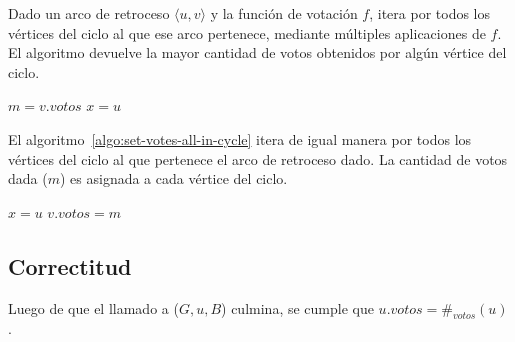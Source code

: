 Dado un arco de retroceso $\langle u, v \rangle$ y la funci\'on de votaci\'on $f$, \maxincyclecaption \;itera por todos los v\'ertices del ciclo al que ese arco pertenece, mediante m\'ultiples aplicaciones de $f$. El algoritmo devuelve la mayor cantidad de votos obtenidos por alg\'un v\'ertice del ciclo. 

\begin{algorithm}[!h]
    \caption{\maxincyclecaption}
    \label{algo:max-in-cycle}
    \DontPrintSemicolon
    \SetAlgoLined
    \BlankLine

    $m = v.votos$\;\label{algo:max-in-cycle:line:m-declaration}
    $x = u$\;
    \;
\end{algorithm}

El algoritmo~\ref{algo:set-votes-all-in-cycle} itera de igual manera por todos los v\'ertices del ciclo al que pertenece el arco de retroceso dado. La cantidad de votos dada ($m$) es asignada a cada v\'ertice del ciclo.

\begin{algorithm}[!h]
    \caption{\setvotestoallincyclecaption}
    \label{algo:set-votes-all-in-cycle}
    \DontPrintSemicolon
    \SetAlgoLined
    \BlankLine

    $x = u$\;
    $v.votos = m$\;
\end{algorithm}

\subsection{Correctitud}

\begin{lemma}\label{lemma:dfs-visit}
    Luego de que el llamado a \dfsvisitcaption($G, u, B$) culmina, se cumple que $u.votos = \#_{votos}(u)$.
\end{lemma}


